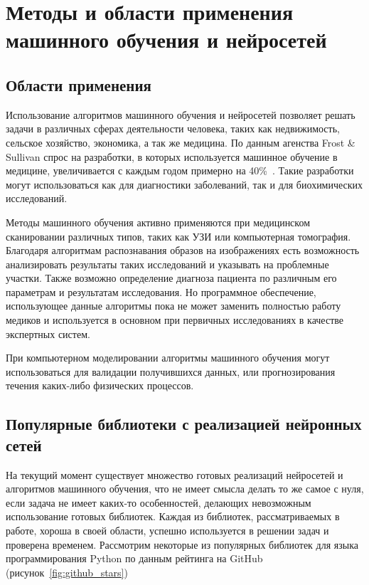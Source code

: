 \chapter{Методы и области применения машинного обучения и нейросетей}

\section{Области применения}

Использование алгоритмов машинного обучения и нейросетей позволяет решать задачи в различных сферах деятельности человека, таких как недвижимость, сельское хозяйство, экономика, а так же медицина. По данным агенства Frost \& Sullivan спрос на разработки, в которых используется машинное обучение в медицине, увеличивается с каждым годом примерно на 40\%~\cite{habrbigdatamedicine}. Такие разработки могут использоваться как для диагностики заболеваний, так  и для биохимических исследований.


Методы машинного обучения активно применяются при медицинском сканировании различных типов, таких как УЗИ или компьютерная томография. Благодаря алгоритмам распознавания образов на изображениях есть возможность анализировать результаты таких исследований и указывать на проблемные участки. Также возможно определение диагноза пациента по различным его параметрам и результатам исследования. Но программное обеспечение, использующее данные алгоритмы пока не может заменить полностью работу медиков и используется в основном при первичных исследованиях в качестве экспертных систем.



При компьютерном моделировании алгоритмы машинного обучения могут использоваться для валидации получившихся данных, или прогнозирования течения каких-либо физических процессов.


\section{Популярные библиотеки с реализацией нейронных сетей}

На текущий момент существует множество готовых реализаций нейросетей и алгоритмов машинного обучения, что не имеет смысла делать то же самое с нуля, если задача не имеет каких-то особенностей, делающих невозможным использование готовых библиотек. Каждая из библиотек, рассматриваемых в работе, хороша в своей области, успешно используется в решении задач и проверена временем. Рассмотрим некоторые из популярных библиотек для языка программирования Python по данным рейтинга на GitHub (рисунок~\ref{fig:github_stars})

